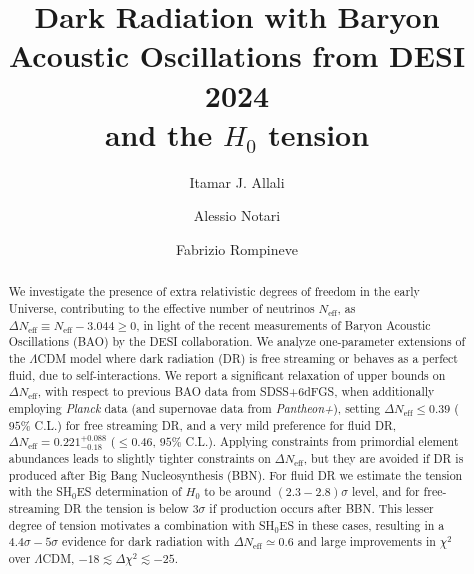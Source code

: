 \documentclass[aps,prd,twocolumn,notitlepage,
superscriptaddress,
nofootinbib,floatfix]{revtex4-2}
\newcommand{\DNeff}{\Delta N_\text{eff}}
\begin{document}
\title{
Dark Radiation with Baryon Acoustic Oscillations from DESI 2024\\
and the $H_0$ tension \\
}

\author{Itamar J. Allali} 

\author{Alessio Notari}


\author{Fabrizio Rompineve}

\begin{abstract}
\noindent We investigate the presence of extra relativistic degrees of freedom in the early Universe, contributing to the effective number of neutrinos $N_\text{eff}$, as $\Delta N_\text{eff}\equiv N_\text{eff}-3.044\geq 0$, in light of the recent measurements of Baryon Acoustic Oscillations (BAO) by the DESI collaboration. We analyze one-parameter extensions of the $\Lambda$CDM model where dark radiation (DR) is free streaming or behaves as a perfect fluid, due to self-interactions. We report a significant relaxation of upper bounds on $\Delta N_\text{eff}$, with respect to previous BAO data from SDSS+6dFGS, when additionally employing \emph{Planck} data (and supernovae data from \emph{Pantheon+}), setting $\Delta N_\text{eff}\leq 0.39$ ($95\%$ C.L.) for free streaming DR, and a very mild preference for fluid DR, $\Delta N_\text{eff} = 0.221^{+0.088}_{-0.18}$ ($\leq 0.46$, $95\%$ C.L.).  
Applying constraints from primordial element abundances leads to slightly tighter constraints on $\DNeff$, but they
are avoided if DR is produced after Big Bang Nucleosynthesis (BBN).
For fluid DR we estimate the tension with the SH$_0$ES determination of $H_0$ to be around $(2.3-2.8)\sigma$ level, and for free-streaming DR the tension is below $3\sigma$ if production occurs after BBN. This lesser degree of tension motivates a combination with SH$_0$ES in these cases, 
resulting in a $4.4\sigma-5\sigma$ evidence for dark radiation with $\Delta N_\text{eff}\simeq 0.6$ and large improvements in $\chi^2$ over $\Lambda$CDM, $-18\lesssim \Delta \chi^2\lesssim -25$. 
\end{abstract}
\end{document}
